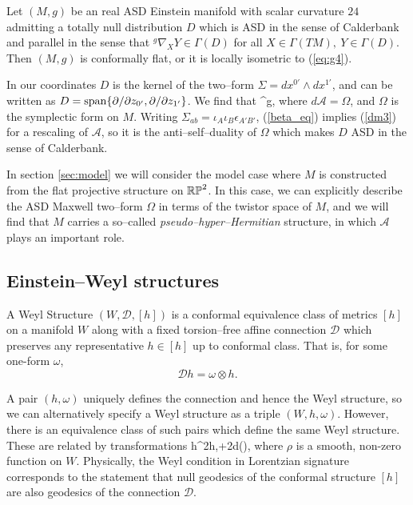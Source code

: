 \begin{theo}\cite{DM} \label{thm:DMcharacterisation}
Let $(M,g)$ be an real ASD Einstein manifold with scalar curvature $24$ admitting a totally null distribution $D$ which is ASD in the sense of Calderbank and parallel in the sense that $^g\nabla_XY\in\Gamma(D)$ for all $X\in \Gamma(TM),\ Y\in\Gamma(D)$. Then $(M,g)$ is conformally flat, or it is locally isometric to (\ref{eq:g4}).
\end{theo}
\noindent

In our coordinates $D$ is the kernel of the two--form $\Sigma=dx^{0'}\wedge dx^{1'}$, and can be written as ${D}=\mathrm{span}\{\partial/\partial z_{0'},\partial/\partial z_{1'}\}$. We find that
\be
\label{beta_eq}
^g\nabla{}\otimes \Sigma,
\ee
where $d\mathcal{A}=\Omega$, and $\Omega$ is the symplectic form on $M$. Writing $\Sigma_{ab}=\iota_A\iota_B\epsilon_{A'B'}$, (\ref{beta_eq}) implies (\ref{dm3}) for a rescaling of $\mathcal{A}$, so it is the anti--self--duality of $\Omega$ which makes $D$ ASD in the sense of Calderbank. 

In section \ref{sec:model} we will consider the model case where $M$ is constructed from the flat projective structure on $\mathbb{RP}^2$. In this case, we can explicitly describe the ASD Maxwell two--form $\Omega$ in terms of the twistor space of $M$,
and we will find that $M$ carries a so--called \textit{pseudo--hyper--Hermitian} structure, in which $\mathcal{A}$ plays an important role.












\subsection{Einstein--Weyl structures}
\begin{defi}
A Weyl Structure $(W,\mathscr{D},[h])$ is a conformal equivalence class of metrics $[h]$ on a manifold $W$ along with a fixed torsion--free affine connection $\mathscr{D}$ which preserves any representative $h\in[h]$ up to conformal class. That is, for some one-form $\omega$,
\[
\mathscr{D}h=\omega\otimes h.
\]
\end{defi}
A pair $(h,\omega)$ uniquely defines the connection and hence the Weyl structure, so we can alternatively specify a Weyl structure as a triple $(W,h,\omega)$. However, there is an equivalence class of such pairs which define the same Weyl structure. These are related by transformations
\be
\label{weyl_tr}
h\rightarrow \rho^2h,\quad\omega\rightarrow\omega+2d(\rho),
\ee
where $\rho$ is a smooth, non-zero function on $W$. 
Physically, the Weyl condition in Lorentzian signature corresponds to the statement that null geodesics of the conformal structure $[h]$ are also geodesics of the connection $\mathscr{D}$.

